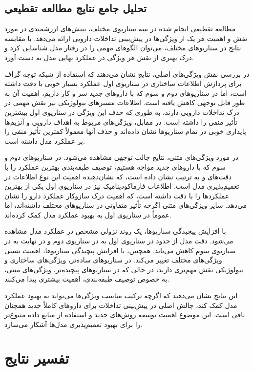 \subsection{تحلیل جامع نتایج مطالعه تقطیعی}

مطالعه تقطیعی انجام شده در سه سناریوی مختلف، بینش‌های ارزشمندی در مورد نقش و اهمیت هر یک از ویژگی‌ها در پیش‌بینی تداخلات دارویی ارائه می‌دهد. با مقایسه نتایج در سناریوهای مختلف، می‌توان الگوهای مهمی را در رفتار مدل شناسایی کرد و درک بهتری از نقش هر ویژگی در عملکرد نهایی مدل به دست آورد.

در بررسی نقش ویژگی‌های اصلی، نتایج نشان می‌دهند که استفاده از شبکه توجه گراف برای پردازش اطلاعات ساختاری در سناریوی اول عملکرد بسیار خوبی با دقت  داشته است، اما در سناریوهای دوم و سوم که با داروهای جدید سر و کار داریم، اهمیت آن به طور قابل توجهی کاهش یافته است. اطلاعات مسیرهای بیولوژیکی نیز نقش مهمی در درک تداخلات دارویی دارند، به طوری که حذف این ویژگی در سناریوی اول بیشترین تأثیر منفی را داشته است. در مقابل، ویژگی‌های مربوط به اهداف دارویی و آنزیم‌ها پایداری خوبی در تمام سناریوها نشان داده‌اند و حذف آنها معمولاً کمترین تأثیر منفی را بر عملکرد مدل داشته است.

در مورد ویژگی‌های متنی، نتایج جالب توجهی مشاهده می‌شود. در سناریوهای دوم و سوم که با داروهای جدید مواجه هستیم، توصیف طبقه‌بندی بهترین عملکرد را با دقت‌های  و  به ترتیب نشان داده است، که نشان‌دهنده اهمیت این نوع اطلاعات در تعمیم‌پذیری مدل است. اطلاعات فارماکودینامیک نیز در سناریوی اول یکی از بهترین عملکردها را با دقت  داشته است، که اهمیت درک سازوکار عملکرد دارو را نشان می‌دهد. سایر ویژگی‌های متنی اگرچه تأثیر متفاوتی در سناریوهای مختلف داشته‌اند، اما عموماً در سناریوی اول به بهبود عملکرد مدل کمک کرده‌اند.

با افزایش پیچیدگی سناریوها، یک روند نزولی مشخص در عملکرد مدل مشاهده می‌شود. دقت مدل از حدود  در سناریوی اول به  در سناریوی دوم و در نهایت به  در سناریوی سوم کاهش می‌یابد. همچنین، با افزایش پیچیدگی سناریوها، اهمیت نسبی ویژگی‌های مختلف تغییر می‌کند. در سناریوهای ساده‌تر، ویژگی‌های ساختاری و بیولوژیکی نقش مهم‌تری دارند، در حالی که در سناریوهای پیچیده‌تر، ویژگی‌های متنی، به خصوص توصیف طبقه‌بندی، اهمیت بیشتری پیدا می‌کنند.

این نتایج نشان می‌دهند که اگرچه ترکیب مناسب ویژگی‌ها می‌تواند به بهبود عملکرد مدل کمک کند، چالش اصلی در پیش‌بینی تداخلات برای داروهای کاملاً جدید همچنان باقی است. این موضوع اهمیت توسعه روش‌های جدید و استفاده از منابع داده متنوع‌تر را برای بهبود تعمیم‌پذیری مدل‌ها آشکار می‌سازد.

\section{تفسیر نتایج}

